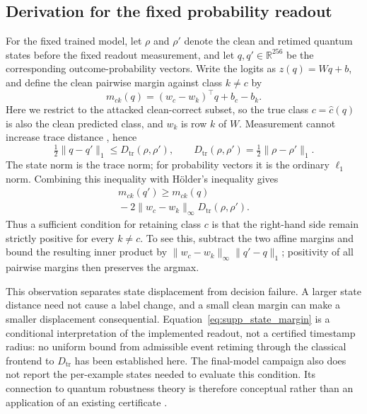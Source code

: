 \subsection{Derivation for the fixed probability readout}
\label{sec:supp_margin}
For the fixed trained model, let $\rho$ and $\rho'$ denote the clean and retimed quantum states before the fixed readout measurement, and let $q,q'\in\mathbb{R}^{256}$ be the corresponding outcome-probability vectors. Write the logits as $z(q)=Wq+b$, and define the clean pairwise margin against class $k\ne c$ by
\begin{equation}
m_{ck}(q)=(w_c-w_k)^\top q+b_c-b_k.
\end{equation}
Here we restrict to the attacked clean-correct subset, so the true class $c=\widehat c(q)$ is also the clean predicted class, and $w_k$ is row $k$ of $W$. Measurement cannot increase trace distance \cite[Corollary 3.40]{watrous2018theory}, hence
\begin{equation}
\tfrac12\|q-q'\|_1\leq D_{\mathrm{tr}}(\rho,\rho'),
\qquad
D_{\mathrm{tr}}(\rho,\rho')=\tfrac12\|\rho-\rho'\|_1.
\end{equation}
The state norm is the trace norm; for probability vectors it is the ordinary $\ell_1$ norm. Combining this inequality with H\"older's inequality gives
\begin{equation}
\begin{split}
m_{ck}(q')\geq m_{ck}(q)\\
{}-2\|w_c-w_k\|_\infty D_{\mathrm{tr}}(\rho,\rho').
\end{split}
\label{eq:supp_state_margin}
\end{equation}
Thus a sufficient condition for retaining class $c$ is that the right-hand side remain strictly positive for every $k\ne c$. To see this, subtract the two affine margins and bound the resulting inner product by $\|w_c-w_k\|_\infty\|q'-q\|_1$; positivity of all pairwise margins then preserves the argmax.

This observation separates state displacement from decision failure. A larger state distance need not cause a label change, and a small clean margin can make a smaller displacement consequential. Equation~\eqref{eq:supp_state_margin} is a conditional interpretation of the implemented readout, not a certified timestamp radius: no uniform bound from admissible event retiming through the classical frontend to $D_{\mathrm{tr}}$ has been established here. The final-model campaign also does not report the per-example states needed to evaluate this condition. Its connection to quantum robustness theory is therefore conceptual rather than an application of an existing certificate \cite{dowling2026guarantees}.

